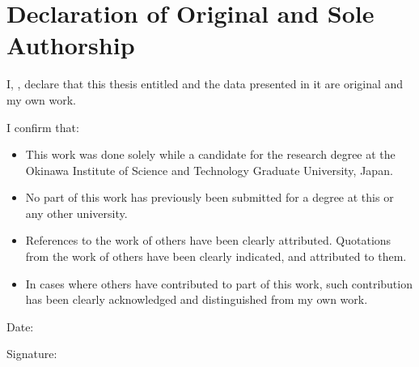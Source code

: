 \chapter*{Declaration of Original and Sole Authorship}

I, \name, declare that this thesis entitled \emph{\thesistitle} and the data presented in it are original and my own work.


I confirm that:
\begin{itemize}
    \item This work was done solely while a candidate for the research degree at the Okinawa Institute of Science and Technology Graduate University, Japan.
    \item No part of this work has previously been submitted for a degree at this or any other university.
    \item References to the work of others have been clearly attributed. Quotations from the work of others have been clearly indicated, and attributed to them.
    \item In cases where others have contributed to part of this work, such contribution has been clearly acknowledged and distinguished from my own work.
\end{itemize}

Date:  \submissiondate

Signature:
